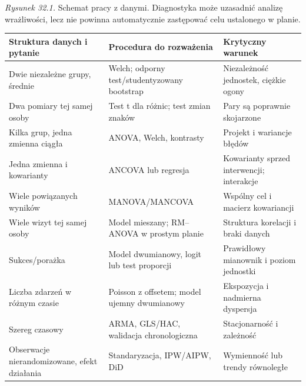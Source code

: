 \begin{center}

{\small\emph{Rysunek 32.1.} Schemat pracy z danymi. Diagnostyka może uzasadnić analizę wrażliwości, lecz nie powinna automatycznie zastępować celu ustalonego w planie.}
\end{center}

\begin{center}\small
\begin{tabular}{>{\raggedright\arraybackslash}p{}>{\raggedright\arraybackslash}p{}>{\raggedright\arraybackslash}p{}}
\toprule
\textbf{Struktura danych i pytanie} & \textbf{Procedura do rozważenia} & \textbf{Krytyczny warunek}\\
\midrule
Dwie niezależne grupy, średnie & Welch; odporny test/studentyzowany bootstrap & Niezależność jednostek, ciężkie ogony\\
Dwa pomiary tej samej osoby & Test t dla różnic; test zmian znaków & Pary są poprawnie skojarzone\\
Kilka grup, jedna zmienna ciągła & ANOVA, Welch, kontrasty & Projekt i wariancje błędów\\
Jedna zmienna i kowarianty & ANCOVA lub regresja & Kowarianty sprzed interwencji; interakcje\\
Wiele powiązanych wyników & MANOVA/MANCOVA & Wspólny cel i macierz kowariancji\\
Wiele wizyt tej samej osoby & Model mieszany; RM--ANOVA w prostym planie & Struktura korelacji i braki danych\\
Sukces/porażka & Model dwumianowy, logit lub test proporcji & Prawidłowy mianownik i poziom jednostki\\
Liczba zdarzeń w różnym czasie & Poisson z offsetem; model ujemny dwumianowy & Ekspozycja i nadmierna dyspersja\\
Szereg czasowy & ARMA, GLS/HAC, walidacja chronologiczna & Stacjonarność i zależność\\
Obserwacje nierandomizowane, efekt działania & Standaryzacja, IPW/AIPW, DiD & Wymienność lub trendy równoległe\\
\bottomrule
\end{tabular}
\end{center}

